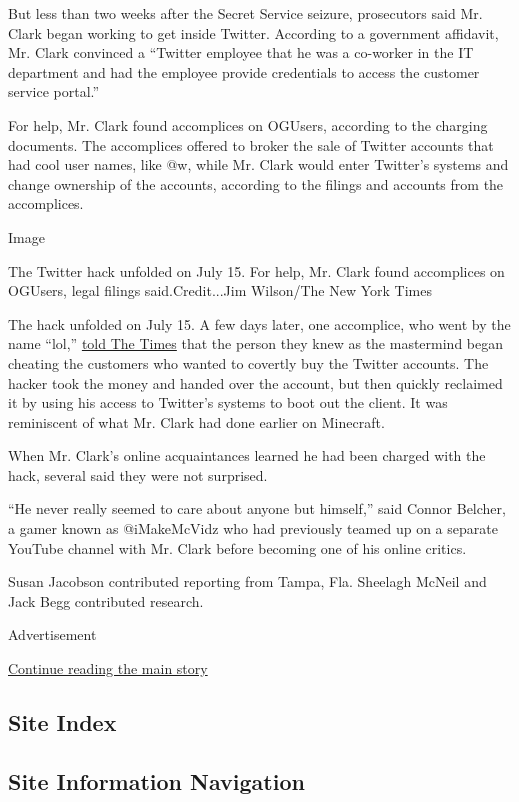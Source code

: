 But less than two weeks after the Secret Service seizure, prosecutors
said Mr. Clark began working to get inside Twitter. According to a
government affidavit, Mr. Clark convinced a ``Twitter employee that he
was a co-worker in the IT department and had the employee provide
credentials to access the customer service portal.''

For help, Mr. Clark found accomplices on OGUsers, according to the
charging documents. The accomplices offered to broker the sale of
Twitter accounts that had cool user names, like @w, while Mr. Clark
would enter Twitter's systems and change ownership of the accounts,
according to the filings and accounts from the accomplices.

Image

The Twitter hack unfolded on July 15. For help, Mr. Clark found
accomplices on OGUsers, legal filings said.Credit...Jim Wilson/The New
York Times

The hack unfolded on July 15. A few days later, one accomplice, who went
by the name ``lol,''
\href{https://www.nytimes3xbfgragh.onion/2020/07/17/technology/twitter-hackers-interview.html}{told
The Times} that the person they knew as the mastermind began cheating
the customers who wanted to covertly buy the Twitter accounts. The
hacker took the money and handed over the account, but then quickly
reclaimed it by using his access to Twitter's systems to boot out the
client. It was reminiscent of what Mr. Clark had done earlier on
Minecraft.

When Mr. Clark's online acquaintances learned he had been charged with
the hack, several said they were not surprised.

``He never really seemed to care about anyone but himself,'' said Connor
Belcher, a gamer known as @iMakeMcVidz who had previously teamed up on a
separate YouTube channel with Mr. Clark before becoming one of his
online critics.

Susan Jacobson contributed reporting from Tampa, Fla. Sheelagh McNeil
and Jack Begg contributed research.

Advertisement

\protect\hyperlink{after-bottom}{Continue reading the main story}

\hypertarget{site-index}{%
\subsection{Site Index}\label{site-index}}

\hypertarget{site-information-navigation}{%
\subsection{Site Information
Navigation}\label{site-information-navigation}}

